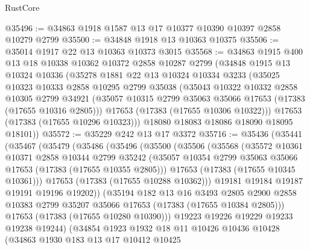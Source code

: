 \begin{lexlean}{RustCore}
\begin{coremodule}
@35496 := @34863 @1918 @1587 @13 @17 @10377 @10390 @10397 @2858 @10279 @2799
@35500 := @34848 @1918 @13 @10363 @10375
@35506 := @35014 @1917 @22 @13 @10363 @10373 @3015
@35568 := @34863
    @1915
    @400
    @13
    @18
    @10338
    @10362
    @10372
    @2858
    @10287
    @2799
    (@34848
      @1915
      @13
      @10324
      @10336
      (@35278
        @1881
        @22
        @13
        @10324
        @10334
        @3233
        (@35025
          @10323
          @10333
          @2858
          @10295
          @2799
          @35038
          (@35043
            @10322
            @10332
            @2858
            @10305
            @2799
            @34921
            (@35057 @10315 @2799 @35063 @35066 @17653 (@17383 (@17655 @10316 @2805)))
            @17653
            (@17383 (@17655 @10306 @10322)))
          @17653
          (@17383 (@17655 @10296 @10323)))
        @18080
        @18083
        @18086
        @18090
        @18095
        @18101))
@35572 := @35229 @242 @13 @17 @3372
@35716 := @35436
    (@35441
      (@35467
        (@35479
          (@35486
            (@35496
              (@35500
                (@35506
                  (@35568
                    (@35572
                      @10361
                      @10371
                      @2858
                      @10344
                      @2799
                      @35242
                      (@35057 @10354 @2799 @35063 @35066 @17653 (@17383 (@17655 @10355 @2805)))
                      @17653
                      (@17383 (@17655 @10345 @10361)))
                    @17653
                    (@17383 (@17655 @10288 @10362)))
                  @19181
                  @19184
                  @19187
                  @19191
                  @19196
                  @19202))
              (@35194
                @182
                @13
                @16
                @3493
                @2805
                @2900
                @2858
                @10383
                @2799
                @35207
                @35066
                @17653
                (@17383 (@17655 @10384 @2805)))
              @17653
              (@17383 (@17655 @10280 @10390)))
            @19223
            @19226
            @19229
            @19233
            @19238
            @19244)
          (@34854
            @1923
            @1932
            @18
            @11
            @10426
            @10436
            @10428
            (@34863
              @1930
              @183
              @13
              @17
              @10412
              @10425

\end{coremodule}
\end{lexlean}

